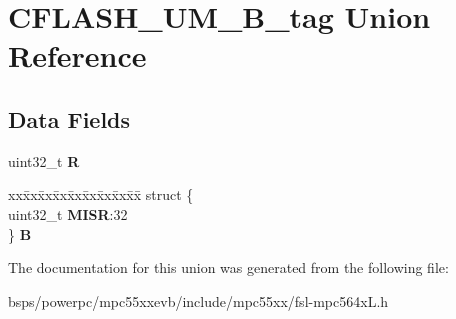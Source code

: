\hypertarget{unionCFLASH__UM__32B__tag}{}\section{C\+F\+L\+A\+S\+H\+\_\+\+U\+M\+\_\+B\+\_\+tag Union Reference}
\label{unionCFLASH__UM__32B__tag}
\subsection*{Data Fields}
\begin{DoxyCompactItemize}
\item 
\mbox{\label{unionCFLASH__UM__32B__tag_a432435606f276c12666aea2e8b8c3cc7}} 
uint32\+\_\+t {\bfseries R}
\item 
\mbox{\label{unionCFLASH__UM__32B__tag_a74d09acc1c35ca400fc1f90b1509aa1f}} 
\begin{tabbing}
xx\=xx\=xx\=xx\=xx\=xx\=xx\=xx\=xx\=\kill
struct \{\\
\>uint32\_t {\bfseries MISR}:32\\
\} {\bfseries B}\\

\end{tabbing}\end{DoxyCompactItemize}


The documentation for this union was generated from the following file\+:\begin{DoxyCompactItemize}
\item 
bsps/powerpc/mpc55xxevb/include/mpc55xx/fsl-\/mpc564x\+L.\+h\end{DoxyCompactItemize}
